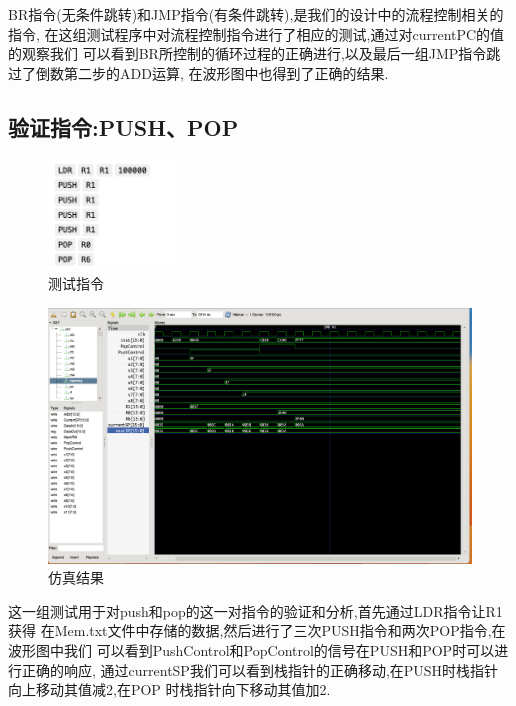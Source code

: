 \documentclass{article}
\begin{document}
BR指令(无条件跳转)和JMP指令(有条件跳转),是我们的设计中的流程控制相关的指令,
在这组测试程序中对流程控制指令进行了相应的测试,通过对currentPC的值的观察我们
可以看到BR所控制的循环过程的正确进行,以及最后一组JMP指令跳过了倒数第二步的ADD运算,
在波形图中也得到了正确的结果.



\subsection{验证指令:PUSH、POP}

\begin{figure}[H]
\centering
\includegraphics[width=0.3\textwidth]{pic/2.png}
\caption{\label{pr}测试指令}
\end{figure}
    
    



\begin{figure}[H]
\centering
\includegraphics[width=1.2\textwidth]{pic/1.png}
\caption{\label{pr}仿真结果}
\end{figure}

这一组测试用于对push和pop的这一对指令的验证和分析,首先通过LDR指令让R1获得
在Mem.txt文件中存储的数据,然后进行了三次PUSH指令和两次POP指令,在波形图中我们
可以看到PushControl和PopControl的信号在PUSH和POP时可以进行正确的响应,
通过currentSP我们可以看到栈指针的正确移动,在PUSH时栈指针向上移动其值减2,在POP
时栈指针向下移动其值加2.
\end{document}
